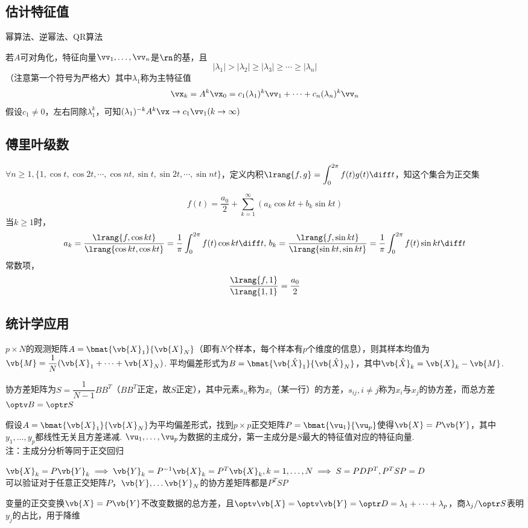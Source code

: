 \subsection{估计特征值}%
幂算法、逆幂法、QR算法
\par 若$A$可对角化，特征向量$\vv_1,\dots,\vv_n$是$\rn$的基，且
\[|\lambda_1|>|\lambda_2|\geq|\lambda_3|\geq\cdots\geq|\lambda_n|\]
（注意第一个符号为严格大）其中$\lambda_1$称为主特征值
\[\vx_k=A^k\vx_0=c_1(\lambda_1)^k\vv_1+\cdots+c_n(\lambda_n)^k\vv_n\]
假设$c_1\ne 0$，左右同除$\lambda_1^k$，可知$(\lambda_1)^{-k}A^k\vx\to c_1\vv_1(k\to\infty)$

\subsection{傅里叶级数}%
$\forall n\geq 1,\{1,\cos t,\cos 2t,\cdots,\cos nt,\sin t,\sin 2t,\cdots,\sin nt\}$，定义内积$\lrang{f,g}=\displaystyle\int_0^{2\pi} f(t)g(t)\diff t$，知这个集合为正交集
\begin{theorem}
\[f(t)=\dfrac{a_0}{2}+\sum_{k=1}^\infty(a_k\cos kt+b_k\sin kt)\]
当$k\geq 1$时，
\[a_k=\dfrac{\lrang{f,\cos kt}}{\lrang{\cos kt,\cos kt}}=\dfrac{1}{\pi}\int_0^{2\pi}f(t)\cos kt\diff t,\,b_k=\dfrac{\lrang{f,\sin kt}}{\lrang{\sin kt,\sin kt}}=\dfrac{1}{\pi}\int_0^{2\pi}f(t)\sin kt\diff t\]
常数项，
\[\dfrac{\lrang{f,1}}{\lrang{1,1}}=\dfrac{a_0}{2}\]
\end{theorem}

\subsection{统计学应用}%
\begin{definition}[平均值]
$p\times N$的观测矩阵$A=\bmat{\vb{X}_1}{\vb{X}_N}$（即有$N$个样本，每个样本有$p$个维度的信息），则其样本均值为$\vb{M}=\dfrac{1}{N}(\vb{X}_1+\cdots+\vb{X}_N)$. 平均偏差形式为$B=\bmat{\vb{\hat{X}}_1}{\vb{\hat{X}}_N}$，其中$\vb{\hat{X}}_k=\vb{X}_k-\vb{M}$.
\end{definition}
\begin{definition}[方差]
协方差矩阵为$S=\dfrac{1}{N-1}BB^T$（$BB^T$正定，故$S$正定），其中元素$s_{ii}$称为$x_i$（某一行）的方差，$s_{ij},i\ne j$称为$x_i$与$x_j$的协方差，而总方差$\optv B=\optr S$
\end{definition}
\begin{definition}[主成分分析]
假设$A=\bmat{\vb{X}_1}{\vb{X}_N}$为平均偏差形式，找到$p\times p$正交矩阵$P=\bmat{\vu_1}{\vu_p}$使得$\vb{X}=P\vb{Y}$，其中$y_1,\dots,y_p$都线性无关且方差递减. $\vu_1,\dots,\vu_p$为数据的主成分，第一主成分是$S$最大的特征值对应的特征向量.\\
注：主成分分析等同于正交回归
\end{definition}
\begin{analysis}
$\vb{X}_k=P\vb{Y}_k\implies \vb{Y}_k=P^{-1}\vb{X}_k=P^T\vb{X}_k,k=1,\dots,N\implies S=PDP^T, P^TSP=D$\\
可以验证对于任意正交矩阵$P$，$\vb{Y},\dots\vb{Y}_N$的协方差矩阵都是$P^TSP$
\end{analysis}
变量的正交变换$\vb{X}=P\vb{Y}$不改变数据的总方差，且$\optv \vb{X}=\optv \vb{Y}=\optr D=\lambda_1+\cdots+\lambda_p$，商$\lambda_j/\optr S$表明$y_j$的占比，用于降维